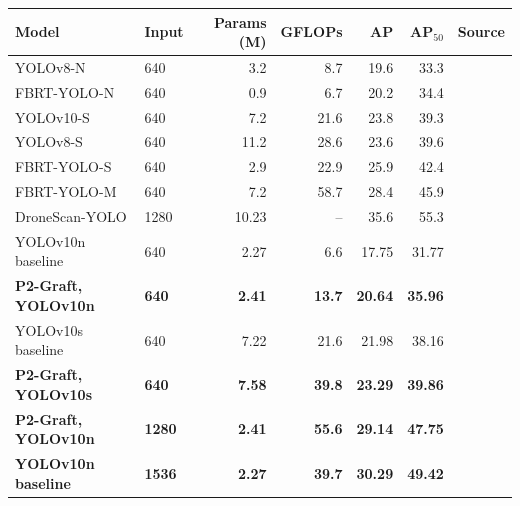 \begin{tabular}{llrrrrl}
\toprule
Model & Input & Params (M) & GFLOPs & AP & AP$_{50}$ & Source \\
\midrule
YOLOv8-N & 640 & 3.2 & 8.7 & 19.6 & 33.3 & \cite{xiao2025fbrt} \\
FBRT-YOLO-N & 640 & 0.9 & 6.7 & 20.2 & 34.4 & \cite{xiao2025fbrt} \\
YOLOv10-S & 640 & 7.2 & 21.6 & 23.8 & 39.3 & \cite{xiao2025fbrt} \\
YOLOv8-S & 640 & 11.2 & 28.6 & 23.6 & 39.6 & \cite{xiao2025fbrt} \\
FBRT-YOLO-S & 640 & 2.9 & 22.9 & 25.9 & 42.4 & \cite{xiao2025fbrt} \\
FBRT-YOLO-M & 640 & 7.2 & 58.7 & 28.4 & 45.9 & \cite{xiao2025fbrt} \\
DroneScan-YOLO & 1280 & 10.23 & -- & 35.6 & 55.3 & \cite{bellec2026dronescan} \\
\midrule
YOLOv10n baseline & 640 & 2.27 & 6.6 & 17.75 & 31.77 & \\
\textbf{P2-Graft, YOLOv10n} & \textbf{640} & \textbf{2.41} & \textbf{13.7} & \textbf{20.64} & \textbf{35.96} & \\
YOLOv10s baseline & 640 & 7.22 & 21.6 & 21.98 & 38.16 & \\
\textbf{P2-Graft, YOLOv10s} & \textbf{640} & \textbf{7.58} & \textbf{39.8} & \textbf{23.29} & \textbf{39.86} & \\
\textbf{P2-Graft, YOLOv10n} & \textbf{1280} & \textbf{2.41} & \textbf{55.6} & \textbf{29.14} & \textbf{47.75} & \\
\textbf{YOLOv10n baseline} & \textbf{1536} & \textbf{2.27} & \textbf{39.7} & \textbf{30.29} & \textbf{49.42} & \\
\bottomrule
\end{tabular}